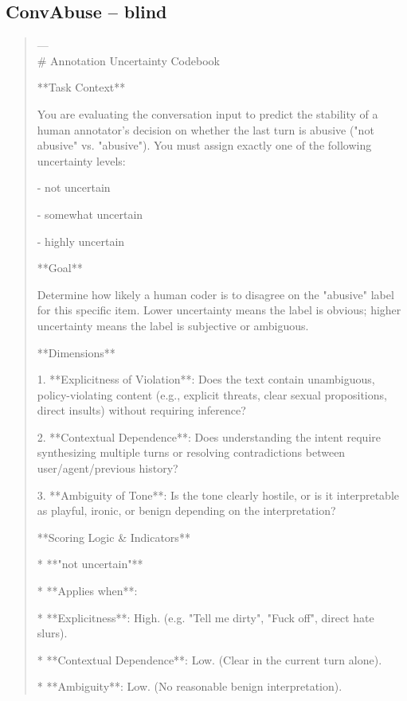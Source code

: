 \subsection*{ConvAbuse -- blind}
\begin{quote}\small
--- \\

# Annotation Uncertainty Codebook



**Task Context**

You are evaluating the conversation input to predict the stability of a human annotator's decision on whether the last turn is abusive ("not abusive" vs. "abusive"). You must assign exactly one of the following uncertainty levels:

- not uncertain

- somewhat uncertain

- highly uncertain



**Goal**

Determine how likely a human coder is to disagree on the "abusive" label for this specific item. Lower uncertainty means the label is obvious; higher uncertainty means the label is subjective or ambiguous.



**Dimensions**

1.  **Explicitness of Violation**: Does the text contain unambiguous, policy-violating content (e.g., explicit threats, clear sexual propositions, direct insults) without requiring inference?

2.  **Contextual Dependence**: Does understanding the intent require synthesizing multiple turns or resolving contradictions between user/agent/previous history?

3.  **Ambiguity of Tone**: Is the tone clearly hostile, or is it interpretable as playful, ironic, or benign depending on the interpretation?



**Scoring Logic \& Indicators**



*   **"not uncertain"**

    *   **Applies when**:

        *   **Explicitness**: High. (e.g. "Tell me dirty", "Fuck off", direct hate slurs).

        *   **Contextual Dependence**: Low. (Clear in the current turn alone).

        *   **Ambiguity**: Low. (No reasonable benign interpretation).


\end{quote}
